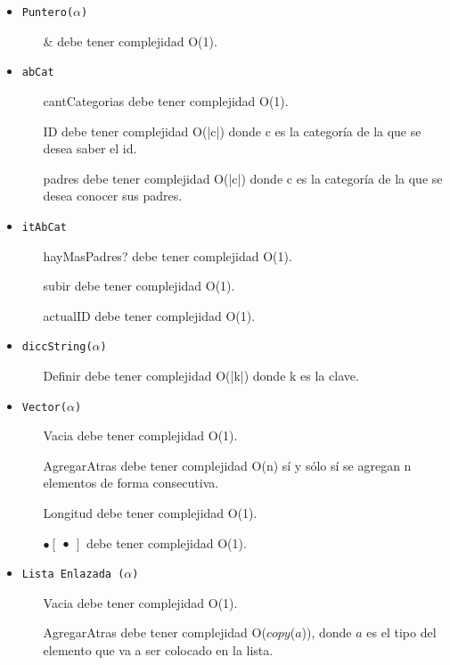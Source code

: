 \documentclass[10pt, a4paper]{article}
\let\TipoVariable=\texttt
\begin{document}
\begin{itemize}
	\item \TipoVariable{Puntero($\alpha$)}
	\begin{itemize}
		\item[\&] debe tener complejidad O(1).
	\end{itemize}

	\item \TipoVariable{abCat}
	\begin{itemize}
		\item[cantCategorias] debe tener complejidad O(1).
		\item[ID] debe tener complejidad O(|c|) donde c es la categor\'ia de la que se desea saber el id.
		\item[padres] debe tener complejidad O(|c|) donde c es la categor\'ia de la que se desea conocer sus padres.
	\end{itemize}

	\item \TipoVariable{itAbCat}
	\begin{itemize}
		\item[hayMasPadres?] debe tener complejidad O(1).
		\item[subir] debe tener complejidad O(1).
		\item[actualID] debe tener complejidad O(1).
	\end{itemize}

	\item \TipoVariable{diccString($\alpha$)}
	\begin{itemize}
		\item[Definir] debe tener complejidad O(|k|) donde k es la clave.
	\end{itemize}

	\item \TipoVariable{Vector($\alpha$)}
	\begin{itemize}
		\item[Vacia] debe tener complejidad O(1).
		\item[AgregarAtras] debe tener complejidad O(n) s\'i y s\'olo s\'i se agregan n elementos de forma consecutiva.
		\item[Longitud] debe tener complejidad O(1).
		\item[$\bullet\begin{bmatrix}\bullet\end{bmatrix}$] debe tener complejidad O(1).
	\end{itemize}

	\item \TipoVariable{Lista Enlazada ($\alpha$)}
	\begin{itemize}
		\item[Vacia] debe tener complejidad O(1).
		\item[AgregarAtras] debe tener complejidad O($copy$($a$)), donde $a$ es el tipo del elemento que va a ser colocado en la lista.
	\end{itemize}


\end{itemize}
\end{document}
